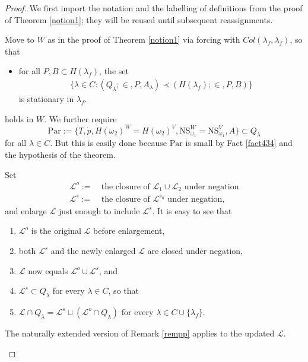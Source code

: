 \documentclass[12pt]{article}
\numberwithin{equation}{section}
\begin{document}
\begin{proof}
We first import the notation and the labelling of definitions from the proof of Theorem \ref{notion1}; they will be reused until subsequent reassignments. 

Move to $W$ as in the proof of Theorem \ref{notion1} via forcing with $Col(\lambda_f, \lambda_f)$, so that 
\begin{itemize}[label=($\diamond$)]
    \item for all $P, B \subset H(\lambda_f)$, the set
    \begin{align*}
        \{\lambda \in C : (Q_{\lambda}; \in, P, A_{\lambda}) \prec (H(\lambda_f); \in, P, B)\}
    \end{align*}
    is stationary in $\lambda_f$.
\end{itemize}
holds in $W$. We further require 
\begin{equation*}
    \mathrm{Par} := \{T, \dot{p}, H(\omega_2)^W = H(\omega_2)^V, \mathrm{NS}_{\omega_1}^W = \mathrm{NS}_{\omega_1}^V, A\} \subset Q_{\lambda}
\end{equation*}
for all $\lambda \in C$. But this is easily done because $\mathrm{Par}$ is small by Fact \ref{fact434} and the hypothesis of the theorem. 

Set
\begin{align*}
    \mathcal{L}^o := \ & \text{the closure of } \mathcal{L}_1 \cup \mathcal{L}_2 \text{ under negation} \\
    \mathcal{L}^s := \ & \text{the closure of } \mathcal{L}^{s_0} \text{ under negation},
\end{align*}
and enlarge $\mathcal{L}$ just enough to include $\mathcal{L}^s$. It is easy to see that
\begin{enumerate}[label=(\Alph*)]
    \item\label{33a} $\mathcal{L}^o$ is the original $\mathcal{L}$ before enlargement,
    \item both $\mathcal{L}^s$ and the newly enlarged $\mathcal{L}$ are closed under negation, 
    \item $\mathcal{L}$ now equals $\mathcal{L}^o \cup \mathcal{L}^s$, and
    \item $\mathcal{L}^s \subset Q_{\lambda}$ for every $\lambda \in C$, so that
    \item $\mathcal{L} \cap Q_{\lambda} = \mathcal{L}^s \sqcup (\mathcal{L}^o \cap Q_{\lambda})$ for every $\lambda \in C \cup \{\lambda_f\}$.
\end{enumerate}

\begin{rem}\label{rempp2}
The naturally extended version of Remark \ref{rempp} applies to the updated $\mathcal{L}$.
\end{rem}


\end{proof}
\end{document}
